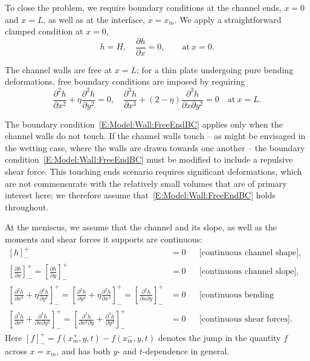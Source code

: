 \documentclass{jfm}
\newcommand{\ddp}[2]{\frac{\partial #1}{\partial #2}}
\newcommand{\poisson}{\eta} %
\newcommand{\x}{x}
\begin{document}
To close the problem, we require boundary conditions at the channel ends, $x= 0$ and $x = L$, as well as at the interface, $x = x_m$. We apply a straightforward clamped condition at $x = 0$,
\begin{equation}\label{E:Model:Wall:ClampedBC}
h= H, \quad \ddp{h}{x} = 0, \qquad \text{at}~x = 0.
\end{equation}

The channel walls are free at $x = L$; for a thin plate undergoing pure bending deformations, free boundary conditions are imposed by requiring~\citep{Timoshenko1959}
\begin{equation}\label{E:Model:Wall:FreeEndBC}
\ddp{^2 h}{x^2} + \poisson \ddp{^2 h}{y^2} =0, \quad  \ddp{^3 h}{x^3} + (2-\poisson) \ddp{^3 h}{x \partial y^2} = 0\quad \text{at}~x = L.
\end{equation}

The boundary condition~\eqref{E:Model:Wall:FreeEndBC} applies only when the channel walls do not touch. If the channel walls touch -- as might be envisaged in the wetting case, where the walls are drawn towards one another -- the boundary condition~\eqref{E:Model:Wall:FreeEndBC} must be modified to include a repulsive shear force. This touching ends scenario requires significant deformations, which are not commensurate with the relatively small volumes that are of primary interest here; we therefore assume that~\eqref{E:Model:Wall:FreeEndBC} holds throughout. 

At the meniscus, we assume that the channel and its slope, as well as the moments and shear forces it supports are continuous:
\begin{align}
\left[ h \right]_{-}^{+}  &= 0 & &\text{[continuous channel shape]},\label{E:Model:Wall:ContinuityBC1}\\
\left[\ddp{h}{x} \right]_{-}^{+} = \left[\ddp{h}{y} \right]_{-}^{+} &=0 & &\text{[continuous channel slope],}  \\ 
\left[\ddp{^2 h}{x^2} + \poisson \ddp{^2 h}{y^2} \right]_{-}^{+} =   \left[\ddp{^2 h}{y^2} + \poisson \ddp{^2 h}{x^2}  \right]_{-}^{+} =  \left[\ddp{^2 h}{x \partial y} \right]_{-}^{+} &= 0 & &\text{[continuous bending moments],} \\
\left[\ddp{^3 h}{x^3} + \ddp{^3 h}{ x\partial y^2}\right]_{-}^{+} =  \left[\ddp{^3 h}{ x^2 \partial y} + \ddp{^3 h}{y^3} \right]_{-}^{+} &=0  & &\text{[continuous shear forces].}\label{E:Model:Wall:ContinuityBC4} 
\end{align}
Here $\left[ f \right]_-^+ = f(\x_m^+,y,t) - f(\x_m^-,y,t)$ denotes the jump in the quantity $f$ across $x = x_m$, and has both $y$- and $t$-dependence in general.
\end{document}
